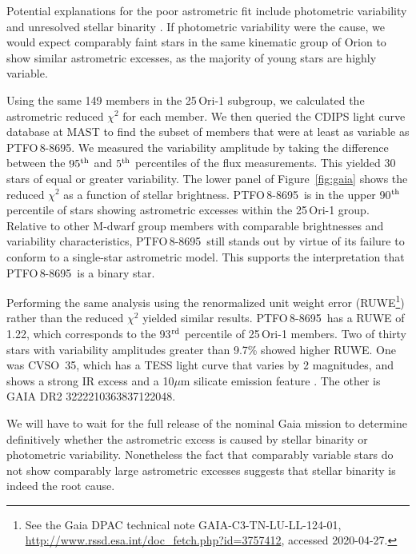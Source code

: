 \documentclass[12pt,twocolumn,tighten]{aastex62}
\newcommand{\ptfo}{PTFO$\,$8-8695}
\begin{document}
Potential explanations for the poor astrometric fit include
photometric variability and unresolved stellar binarity \citep[{\it
e.g.},][]{rizzuto_ZEIT8_2018,belokurov_unresolved_2020}.  If
photometric variability were the cause, we would expect comparably
faint stars in the same kinematic group of Orion to show similar
astrometric excesses, as the majority of young stars are highly
variable.

Using the same 149 members in the 25$\,$Ori-1 subgroup, we calculated
the astrometric reduced $\chi^2$ for each member.  We then queried the
CDIPS light curve database at MAST \citep{bouma_cluster_2019} to find
the subset of members that were at least as variable as \ptfo.  We
measured the variability amplitude by taking the difference between
the $95^{\rm th}$ and $5^{\rm th}$ percentiles of the flux
measurements.  This yielded 30 stars of equal or greater variability.
The lower panel of Figure~\ref{fig:gaia} shows the reduced $\chi^2$ as
a function of stellar brightness.  \ptfo\ is in the upper 90$^{\rm
th}$ percentile of stars showing astrometric excesses within the
25$\,$Ori-1 group.  Relative to other M-dwarf group members with
comparable brightnesses and variability characteristics, \ptfo\ still
stands out by virtue of its failure to conform to a single-star
astrometric model. This supports the interpretation that \ptfo\ is a
binary star.

Performing the same analysis using the renormalized unit weight error
(RUWE\footnote{ See the Gaia DPAC technical note
GAIA-C3-TN-LU-LL-124-01,
\url{http://www.rssd.esa.int/doc_fetch.php?id=3757412}, accessed
2020-04-27. }) rather than the reduced $\chi^2$ yielded similar
results.  \ptfo\ has a RUWE of 1{.}22, which corresponds to the
93$^{\rm rd}$ percentile of 25$\,$Ori-1 members.  Two of thirty stars
with variability amplitudes greater than 9.7\% showed higher RUWE.
One was CVSO~35, which has a TESS light curve that varies by 2
magnitudes, and shows a strong IR excess and a 10$\mu$m silicate emission
feature \citep{mauco_herschel_2018}.  The other is GAIA DR2
3222210363837122048.

We will have to wait for the full release of the nominal Gaia mission
to determine definitively whether the astrometric excess is caused by
stellar binarity or photometric variability.  Nonetheless the fact
that comparably variable stars do not show comparably large
astrometric excesses suggests that stellar binarity is indeed the root
cause.
\end{document}
